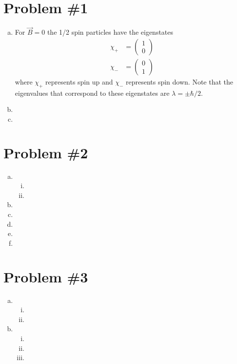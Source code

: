 \documentclass[11pt]{article}
\numberwithin{equation}{section}
\begin{document}


\section{Problem \#1}
\begin{enumerate}[(a)]
\item
For $\vec{B} = 0$ the 1/2 spin particles have the eigenstates 
\begin{align*}
\chi_+ &= \left(\begin{array}{c}1\\ 0\end{array}\right)\\
\chi_- &= \left(\begin{array}{c}0\\ 1\end{array}\right)
\end{align*}
where $\chi_+$ represents spin up and $\chi_-$ represents spin down. Note that the eigenvalues that correspond to these eigenstates are $\lambda = \pm\hbar/2$.

\item



\item
\end{enumerate}

\section{Problem \#2}
\begin{enumerate}[(a)]
\item
\begin{enumerate}[(i)]
\item
\item
\end{enumerate}
\item
\item
\item
\item
\item
\end{enumerate}

\section{Problem \#3}
\begin{enumerate}[(a)]
\item
\begin{enumerate}[(i)]
\item
\item
\end{enumerate}
\item
\begin{enumerate}[(i)]
\item
\item
\item
\end{enumerate}
\end{enumerate}
\end{document}
